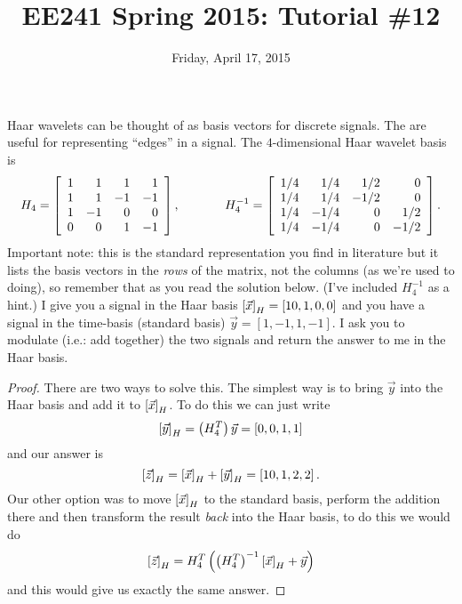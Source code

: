 \documentclass{tutorial}
\begin{document}
\newif\ifsolns

\solnstrue

\title{EE241 Spring 2015: Tutorial \#12}
\date{Friday, April 17, 2015}
\maketitle

\begin{prob}
Haar wavelets can be thought of as basis vectors for discrete signals. The are useful for representing ``edges'' in a signal. The $4$-dimensional Haar wavelet basis is
\[
  H_4 = \left[ \begin{array}{rrrr}
     1 &  1 &  1 &  1 \\
     1 &  1 & -1 & -1 \\
     1 & -1 &  0 &  0 \\
     0 &  0 &  1 & -1
  \end{array} \right], \hspace{0.5in}
  H_4^{-1} = \left[ \begin{array}{rrrr}
    1/4 &  1/4 &  1/2  &    0 \\
    1/4 &  1/4 & -1/2  &    0 \\
    1/4 & -1/4 &    0  &  1/2 \\
    1/4 & -1/4 &    0  & -1/2
  \end{array} \right] .
\]
Important note: this is the standard representation you find in literature but it lists the basis vectors in the \emph{rows} of the matrix, not the columns (as we're used to doing), so remember that as you read the solution below. (I've included $H_4^{-1}$ as a hint.) I give you a signal in the Haar basis $\left[ \vec{x} \right]_H = [10,1,0,0]$ and you have a signal in the time-basis (standard basis) $\vec{y} = [1,-1,1,-1]$. I ask you to modulate (i.e.: add together) the two signals and return the answer to me in the Haar basis.
\end{prob} \ifsolns \begin{proof}
There are two ways to solve this. The simplest way is to bring $\vec{y}$ into the Haar basis and add it to $\left[ \vec{x} \right]_H$. To do this we can just write
\[
  \left[ \vec{y} \right]_H = \left( H_4^T \right) \vec{y} = \left[ 0,0,1,1 \right]
\]
and our answer is
\[
  \left[ \vec{z} \right]_H = \left[ \vec{x} \right]_H + \left[ \vec{y} \right]_H = \left[ 10,1,2,2 \right] .
\]
Our other option was to move $\left[ \vec{x} \right]_H$ to the standard basis, perform the addition there and then transform the result \emph{back} into the Haar basis, to do this we would do
\[
  \left[ \vec{z} \right]_H = H_4^T \left( \left( H_4^T \right)^{-1} \left[\vec{x}\right]_H + \vec{y} \right)
\]
and this would give us exactly the same answer.
\end{proof}\else \vspace{2.5in} \fi
\end{document}
